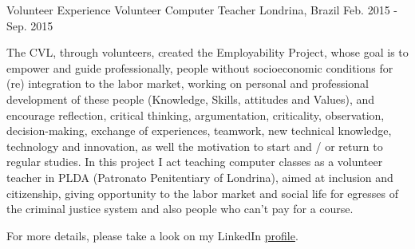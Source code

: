 

\begin{cventries}

  \cventry
    {Volunteer Experience} %
    {Volunteer Computer Teacher} %
    {Londrina, Brazil} %
    {Feb. 2015 - Sep. 2015} %
    {
      \begin{cvitems} %
        \item {The CVL, through volunteers, created the Employability Project, whose goal is to empower and guide professionally, people without socioeconomic conditions for (re) integration to the labor market, working on personal and professional development of these people (Knowledge, Skills, attitudes and Values), and encourage reflection, critical thinking, argumentation, criticality, observation, decision-making, exchange of experiences, teamwork, new technical knowledge, technology and innovation, as well the motivation to start and / or return to regular studies.
 \setlength\itemsep{1em}
In this project I act teaching computer classes as a volunteer teacher in PLDA (Patronato Penitentiary of Londrina), aimed at inclusion and citizenship, giving opportunity to the labor market and social life for egresses of the criminal justice system and also people who can't pay for a course.}
      \end{cvitems}
    }
\end{cventries}

For more details, please take a look on my LinkedIn \color{awesome-orange}\href{https://br.linkedin.com/in/valdeci/en}{profile}\color{black}.
